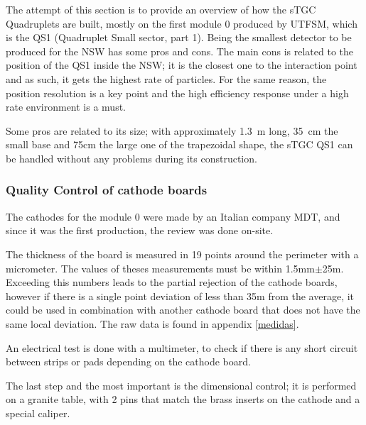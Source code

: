 The attempt of this section is to provide an overview of how the sTGC Quadruplets are built, mostly on the first module 0
produced by UTFSM, which is the QS1 (Quadruplet Small sector, part 1).  Being the smallest detector to be produced for
the NSW has some pros and cons. The main cons is related to the position of the QS1 inside the NSW; it is the closest
one to the interaction point and as such, it gets the highest rate of particles. For the same reason, the position
resolution is a key point and the high efficiency response under a high rate environment is a must.\par


Some pros are related to its size; with approximately \SI{1.3}{m} long, \SI{35}{cm} the small base and 75cm the large
one of the trapezoidal shape, the sTGC QS1 can be handled without any problems during its construction.\par

\subsubsection{Quality Control of cathode boards}

The cathodes for the module 0 were made by an Italian company MDT, and since it was the first production, the review was
done on-site.\par

The thickness of the board is measured in 19 points around the perimeter with a micrometer. The values of theses
measurements must be within 1.5mm$\pm$25\micro m. Exceeding this numbers leads to the partial rejection of the cathode
boards, however if there is a single point deviation of less than 35\micro m from the average, it could be used in
combination with another cathode board that does not have the same local deviation. The raw data is found in appendix
\ref{medidas}.\par

An electrical test is done with a multimeter, to check if there is any short circuit between strips or pads depending on
the cathode board.\par

The last step and the most important is the dimensional control; it is performed on a granite table, with 2 pins that
match the brass inserts on the cathode and a special caliper. 

